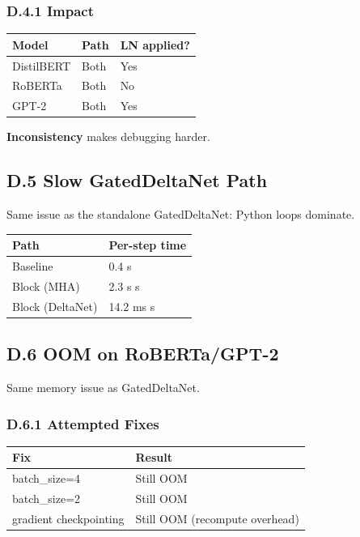 \subsubsection{D.4.1 Impact}

\begin{table}[H]
\centering
\small
\begin{tabular}{lll}
\toprule
\textbf{Model} & \textbf{Path} & \textbf{LN applied?} \\
\midrule
DistilBERT & Both & Yes \\
RoBERTa & Both & No \\
GPT-2 & Both & Yes \\
\bottomrule
\end{tabular}
\end{table}

\textbf{Inconsistency} makes debugging harder.

\subsection{D.5 Slow GatedDeltaNet Path}

Same issue as the standalone GatedDeltaNet: Python loops dominate.

\begin{table}[H]
\centering
\small
\begin{tabular}{ll}
\toprule
\textbf{Path} & \textbf{Per-step time} \\
\midrule
Baseline & 0.4 s \\
Block (MHA) & 2.3 s s \\
Block (DeltaNet) & 14.2 ms s \\
\bottomrule
\end{tabular}
\end{table}

\subsection{D.6 OOM on RoBERTa/GPT-2}

Same memory issue as GatedDeltaNet.

\subsubsection{D.6.1 Attempted Fixes}

\begin{table}[H]
\centering
\small
\begin{tabular}{ll}
\toprule
\textbf{Fix} & \textbf{Result} \\
\midrule
batch\_size=4 & Still OOM \\
batch\_size=2 & Still OOM \\
gradient checkpointing & Still OOM (recompute overhead) \\
\bottomrule
\end{tabular}
\end{table}

